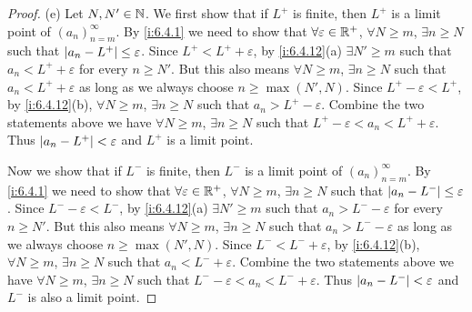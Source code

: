 \begin{proof}{(e)}
  Let \(N, N' \in \mathbb{N}\).
  We first show that if \(L^+\) is finite, then \(L^+\) is a limit point of \((a_n)_{n = m}^\infty\).
  By \cref{i:6.4.1} we need to show that \(\forall \varepsilon \in \mathbb{R}^+\), \(\forall N \geq m\), \(\exists n \geq N\) such that \(\left\lvert a_n - L^+\right\rvert \leq \varepsilon\).
  Since \(L^+ < L^+ + \varepsilon\), by \cref{i:6.4.12}(a) \(\exists N' \geq m\) such that \(a_n < L^+ + \varepsilon\) for every \(n \geq N'\).
  But this also means \(\forall N \geq m\), \(\exists n \geq N\) such that \(a_n < L^+ + \varepsilon\) as long as we always choose \(n \geq \max(N', N)\).
  Since \(L^+ - \varepsilon < L^+\), by \cref{i:6.4.12}(b), \(\forall N \geq m\), \(\exists n \geq N\) such that \(a_n > L^+ - \varepsilon\).
  Combine the two statements above we have \(\forall N \geq m\), \(\exists n \geq N\) such that \(L^+ - \varepsilon < a_n < L^+ + \varepsilon\).
  Thus \(\left\lvert a_n - L^+\right\rvert < \varepsilon\) and \(L^+\) is a limit point.

  Now we show that if \(L^-\) is finite, then \(L^-\) is a limit point of \((a_n)_{n = m}^\infty\).
  By \cref{i:6.4.1} we need to show that \(\forall \varepsilon \in \mathbb{R}^+\), \(\forall N \geq m\), \(\exists n \geq N\) such that \(\left\lvert a_n - L^-\right\rvert \leq \varepsilon\).
  Since \(L^- - \varepsilon < L^-\), by \cref{i:6.4.12}(a) \(\exists N' \geq m\) such that \(a_n > L^- - \varepsilon\) for every \(n \geq N'\).
  But this also means \(\forall N \geq m\), \(\exists n \geq N\) such that \(a_n > L^- - \varepsilon\) as long as we always choose \(n \geq \max(N', N)\).
  Since \(L^- < L^- + \varepsilon\), by \cref{i:6.4.12}(b), \(\forall N \geq m\), \(\exists n \geq N\) such that \(a_n < L^- + \varepsilon\).
  Combine the two statements above we have \(\forall N \geq m\), \(\exists n \geq N\) such that \(L^- - \varepsilon < a_n < L^- + \varepsilon\).
  Thus \(\left\lvert a_n - L^-\right\rvert < \varepsilon\) and \(L^-\) is also a limit point.
\end{proof}

